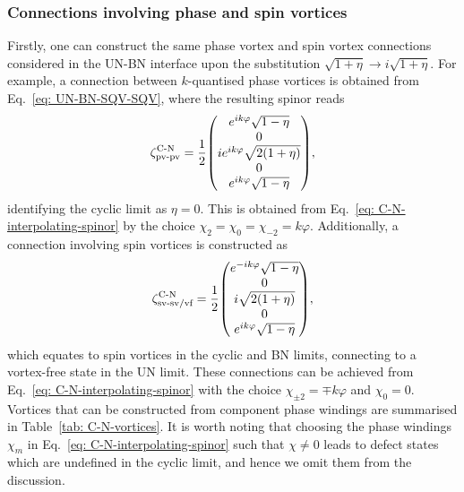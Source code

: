 \subsubsection{Connections involving phase and spin vortices}
Firstly, one can construct the same phase vortex and spin vortex connections
considered in the UN-BN interface upon the substitution \(\sqrt{1+\eta}
\rightarrow i\sqrt{1+\eta}\).
For example, a connection between \(k\)-quantised phase vortices is obtained
from Eq.~\eqref{eq: UN-BN-SQV-SQV}, where the resulting spinor reads
\begin{align}
    \zeta^\text{C-N}_\text{pv-pv} = \frac{1}{2}\mqty(
        e^{ik\varphi}\sqrt{1 - \eta} \\
        0 \\
        ie^{ik\varphi}\sqrt{2(1 + \eta)} \\
        0 \\
        e^{ik\varphi}\sqrt{1 - \eta}
    ),
\end{align}
identifying the cyclic limit as \(\eta = 0\).
This is obtained from Eq.~\eqref{eq: C-N-interpolating-spinor} by the choice
\(\chi_2=\chi_0=\chi_{-2}=k\varphi\).
Additionally, a connection involving spin vortices is constructed as
\begin{align}
    \zeta^\text{C-N}_\text{sv-sv/vf} = \frac{1}{2}\mqty(
        e^{-ik\varphi}\sqrt{1 - \eta} \\
        0 \\
        i\sqrt{2(1 + \eta)} \\
        0 \\
        e^{ik\varphi}\sqrt{1 - \eta}
    ),
\end{align}
which equates to spin vortices in the cyclic and BN limits, connecting to a
vortex-free state in the UN limit.
These connections can be achieved from Eq.~\eqref{eq: C-N-interpolating-spinor}
with the choice \(\chi_{\pm 2} = \mp k\varphi\) and \(\chi_0=0\).
Vortices that can be constructed from component phase windings are summarised in
Table~\ref{tab: C-N-vortices}.
It is worth noting that choosing the phase windings \(\chi_m\) in
Eq.~\eqref{eq: C-N-interpolating-spinor} such that \(\chi \neq 0\) leads
to defect states which are undefined in the cyclic limit, and hence we omit
them from the discussion.
